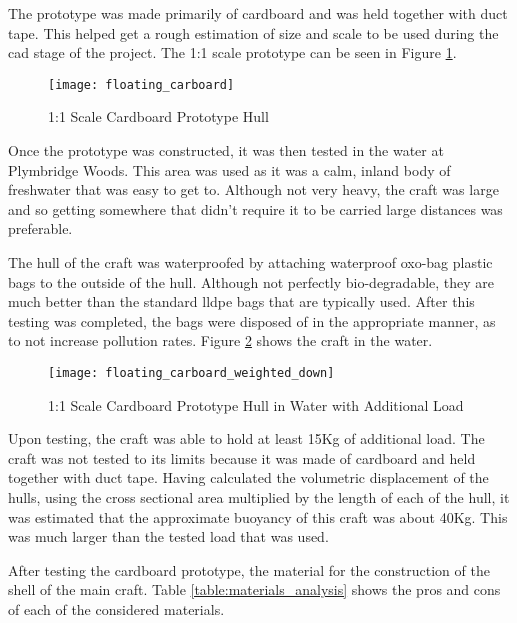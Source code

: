 \documentclass [12pt]{article}
\begin{document}
The prototype was made primarily of cardboard and was held together with duct tape. This helped get a rough estimation of size and scale to be used during the \gls{cad} stage of the project. The 1:1 scale prototype can be seen in Figure \ref{fig:floating_carboard}.

\begin{figure}[H]
\centerline{\texttt{[image: floating\_carboard]}}
\caption{1:1 Scale Cardboard Prototype Hull}
\label{fig:floating_carboard}
\end{figure}

Once the prototype was constructed, it was then tested in the water at Plymbridge Woods. This area was used as it was a calm, inland body of freshwater that was easy to get to. Although not very heavy, the craft was large and so getting somewhere that didn't require it to be carried large distances was preferable. 

The hull of the craft was waterproofed by attaching waterproof \gls{oxo-bag} plastic bags to the outside of the hull. Although not perfectly bio-degradable, they are much better than the standard \gls{lldpe} bags that are typically used. After this testing was completed, the bags were disposed of in the appropriate manner, as to not increase pollution rates. Figure \ref{fig:floating_carboard_weighted_down} shows the craft in the water.

\begin{figure}[H]
\centerline{\texttt{[image: floating\_carboard\_weighted\_down]}}
\caption{1:1 Scale Cardboard Prototype Hull in Water with Additional Load}
\label{fig:floating_carboard_weighted_down}
\end{figure}

Upon testing, the craft was able to hold at least 15Kg of additional load. The craft was not tested to its limits because it was made of cardboard and held together with duct tape. Having calculated the volumetric displacement of the hulls, using the cross sectional area multiplied by the length of each of the hull, it was estimated that the approximate buoyancy of this craft was about 40Kg. This was much larger than the tested load that was used. 

After testing the cardboard prototype, the material for the construction of the shell of the main craft. Table \ref{table:materials_analysis} shows the pros and cons of each of the considered materials.  
\end{document}
